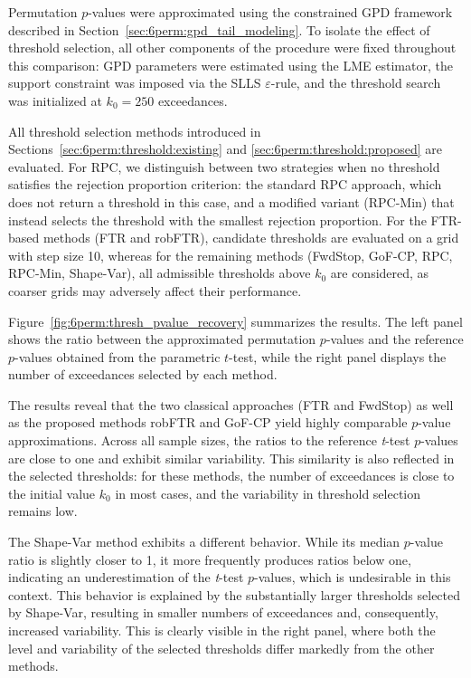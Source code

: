 Permutation $p$-values were approximated using the constrained GPD framework described in Section~\ref{sec:6perm:gpd_tail_modeling}. To isolate the effect of threshold selection, all other components of the procedure were fixed throughout this comparison: GPD parameters were estimated using the LME estimator, the support constraint was imposed via the SLLS $\varepsilon$-rule, and the threshold search was initialized at $k_0=250$ exceedances.

All threshold selection methods introduced in Sections~\ref{sec:6perm:threshold:existing} and \ref{sec:6perm:threshold:proposed} are evaluated. For RPC, we distinguish between two strategies when no threshold satisfies the rejection proportion criterion: the standard RPC approach, which does not return a threshold in this case, and a modified variant (RPC-Min) that instead selects the threshold with the smallest rejection proportion. For the FTR-based methods (FTR and robFTR), candidate thresholds are evaluated on a grid with step size 10, whereas for the remaining methods (FwdStop, GoF-CP, RPC, RPC-Min, Shape-Var), all admissible thresholds above $k_0$ are considered, as coarser grids may adversely affect their performance.

Figure~\ref{fig:6perm:thresh_pvalue_recovery} summarizes the results. 
The left panel shows the ratio between the approximated permutation $p$-values and the reference $p$-values obtained from the parametric $t$-test, while the right panel displays the number of exceedances selected by each method.

The results reveal that the two classical approaches (FTR and FwdStop) as well as the proposed methods robFTR and GoF-CP yield highly comparable $p$-value approximations. Across all sample sizes, the ratios to the reference \textit{t}-test $p$-values are close to one and exhibit similar variability. This similarity is also reflected in the selected thresholds: for these methods, the number of exceedances is close to the initial value $k_0$ in most cases, and the variability in threshold selection remains low.

The Shape-Var method exhibits a different behavior. While its median $p$-value ratio is slightly closer to 1, it more frequently produces ratios below one, indicating an underestimation of the \textit{t}-test $p$-values, which is undesirable in this context. This behavior is explained by the substantially larger thresholds selected by Shape-Var, resulting in smaller numbers of exceedances and, consequently, increased variability. This is clearly visible in the right panel, where both the level and variability of the selected thresholds differ markedly from the other methods.

